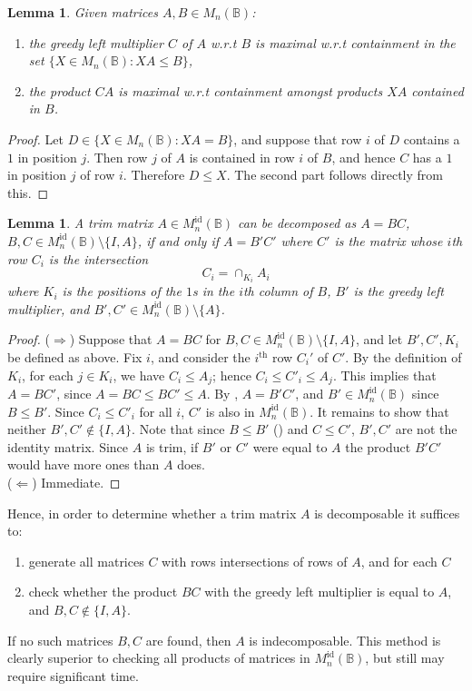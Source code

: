 \documentclass[11pt]{article}
\newtheorem{lemma}[thm]{Lemma}
\numberwithin{equation}{section}
\newcommand{\set}[2]{\ensuremath{\{#1 : #2 \}}}
\newcommand{\B}{\mathbb{B}}
\newcommand{\Bn}{M_n(\B)}
\newcommand{\Refn}{M_n^{\text{id}}(\B)}
\begin{document}
\begin{lemma}
  Given matrices $A, B \in \Bn$:
  \begin{enumerate}
    \item
      the greedy left multiplier $C$ of $A$ w.r.t $B$ is maximal w.r.t
      containment in the set $\set{X \in \Bn}{XA \leq B}$,
    \item 
      the product $CA$ is maximal w.r.t containment amongst products $XA$
      contained in $B$.
  \end{enumerate}
\end{lemma}
\begin{proof}
  Let $D \in \set{X \in \Bn}{XA = B}$, and suppose that row $i$ of $D$ contains
  a $1$ in position $j$. Then row $j$ of $A$ is contained in row $i$ of $B$, and
  hence $C$ has a $1$ in position $j$ of row $i$. Therefore $D \leq X$. The
  second part follows directly from this.
\end{proof}

\begin{lemma}
  A trim matrix $A \in \Refn$ can be decomposed as $A = BC$, $B, C \in
  \Refn\setminus\{I, A\}$, if and only if $A = B'C'$ where $C'$ is the matrix
  whose $i$th row $C_i$ is the intersection 
  \[ C_i = \cap_{K_i} A_i \]
  where $K_i$ is the positions of the $1$s in the $i$th column of $B$, $B'$ is
  the greedy left multiplier, and $B', C' \in \Refn \setminus\{A\}$.
\end{lemma}
\begin{proof}
  ($\Rightarrow$)
  Suppose that $A = BC$ for $B, C \in \Refn \setminus\{I, A\}$, and let $B', C',
  K_i$ be defined as above. Fix $i$, and consider the $i^{\text{th}}$ row $C_i'$
  of $C'$. By the definition of $K_i$, for each $j \in K_i$, we have $C_i \leq
  A_j$; hence $C_i \leq C'_i \leq A_j$. This implies that $A = BC'$, since $A =
  BC \leq BC' \leq A$. By , $A = B'C'$, and $B' \in
  \Refn$ since $B \leq B'$. Since $C_i \leq C'_i$ for all $i$, $C'$ is also in
  $\Refn$. It remains to show that neither $B', C' \not\in \{I, A\}$. Note
  that since $B \leq B'$ () and $C \leq C'$, $B', C'$
  are not the identity matrix. Since $A$ is trim, if $B'$ or $C'$ were equal
  to $A$ the product $B'C'$ would have more ones than $A$ does.\\
  ($\Leftarrow$) Immediate.
\end{proof}
Hence, in order to determine whether a trim matrix $A$ is decomposable it
suffices to:
\begin{enumerate}
  \item generate all matrices $C$ with rows intersections of rows of $A$, and
    for each $C$
  \item check whether the product $BC$ with the greedy left multiplier is equal
    to $A$, and $B, C \not\in \{I, A\}$.
\end{enumerate}
If no such matrices $B, C$ are found, then $A$ is indecomposable. This method is
clearly superior to checking all products of matrices in $\Refn$, but still may
require significant time.\\
\end{document}
